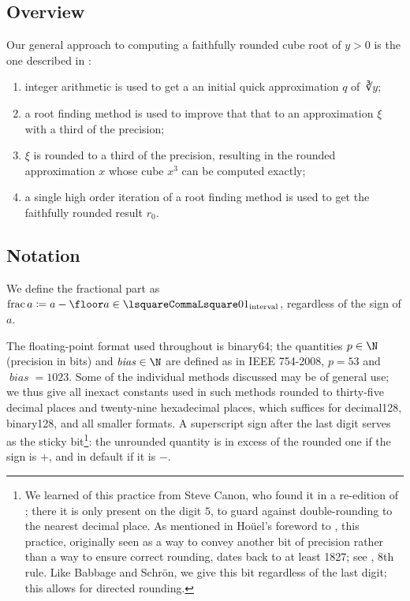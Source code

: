 ﻿\documentclass[10pt, a4paper, twoside]{basestyle}
\DeclareMathOperator{\bias}{\mathit{bias}}
\begin{document}
\subsection*{Overview}
Our general approach to computing a faithfully rounded cube root of $y>0$ is the one described in \cite{KahanBindel2001}:
\begin{enumerate}
\item integer arithmetic is used to get a an initial quick approximation $q$ of $\cuberoot y$;
\item a root finding method is used to improve that that to an approximation $ξ$ with a third of the precision;
\item $ξ$ is rounded to a third of the precision, resulting in the rounded approximation $x$ whose cube $x^3$ can be computed exactly;
\item a single high order iteration of a root finding method is used to get the faithfully rounded result $r_0$.
\end{enumerate} 

\subsection*{Notation}
We define the fractional part as $\FractionalPart a\DefineAs a-\Floor a\in\intclop{0}{1}$, regardless of the sign of $a$.

The floating-point format used throughout is binary64; the quantities $p\in\N$ (precision in bits) and $\bias\in\N$ are 
defined as in IEEE 754-2008, $p=53$ and $\bias=1023$.
Some of the individual methods discussed may be of general use; we thus give all inexact constants used in such methods
rounded to thirty-five decimal places and twenty-nine hexadecimal places, which suffices for
decimal128, binary128, and all smaller formats. A superscript sign after the last
digit serves as the sticky bit\footnote{We learned of this practice from Steve Canon, who found it
in a re-edition of \cite[VIII]{Bruhns1870}; there it is only present on the digit $5$, to guard
against double-rounding to the nearest decimal place.
As mentioned in Hoüel's foreword to \cite[II]{Schrön1873}, this practice, originally seen as a way to
convey another bit of precision rather than a way to ensure correct rounding, dates back to at least
1827; see \cite[X]{Babbage1827}, 8th rule. Like Babbage and Schrön, we give this bit regardless of
the last digit; this allows for directed rounding.}:
the unrounded quantity is in excess of the rounded one if the sign is $+$,
and in default if it is $-$.
\end{document}
